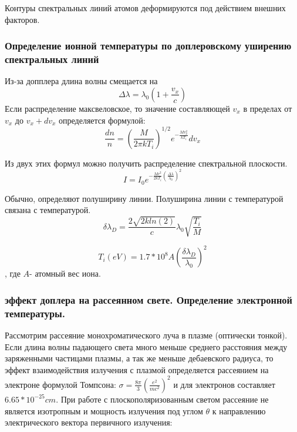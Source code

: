 \documentclass[10pt, a4paper]{article}
\numberwithin{equation}{section}
\begin{document}
Контуры спектральных линий атомов деформируются под действием внешних факторов.
\subsubsection{Определение ионной температуры по доплеровскому уширению спектральных линий}
\label{11.2.3.1}



Из-за допплера длина волны смещается на 
\begin{equation}
	\Delta \lambda = \lambda_0 (1+\frac{v_x}{c})
\end{equation}
Если распределение максвеловское, то  значение составляющей $v_x$  в пределах от  $v_x$  до $v_x + dv_x$ определяется формулой:
\begin{equation}
	\frac{dn}{n}=(\frac{M}{2\pi kT_i})^{1/2} e^{-\frac{Mv^{2}_x}{kT_i}} dv_x
\end{equation}

Из двух этих формул можно получить распределение спектральной плоскости.
\begin{equation}
	I=I_0 e^{-\frac{Mc^{2}}{2kT_i} (\frac{\Delta \lambda}{\lambda_0})^{2}}
\end{equation}

Обычно, определяют полуширину линии. Полуширина линии с температурой связана с температурой.
\begin{equation}
	\delta \lambda_D=\frac{2 \sqrt{2k ln(2)}}{c} \lambda_0 \sqrt{\frac{T_i}{M}}
\end{equation}


\begin{equation}
	T_i(eV)=1.7*10^{8}A(\frac{\delta \lambda_D}{\lambda_0})^{2}
\end{equation}
, где $A$- атомный вес иона.

\subsubsection{эффект доплера на рассеянном свете. Определение электронной температуры.}
\label{11.2.3.2}

Рассмотрим рассеяние монохроматического луча в плазме (оптически тонкой). Если длина волны падающего света много меньше среднего расстояния между заряженными частицами плазмы, а так же меньше дебаевского радиуса, то эффект взаимодействия излучения с плазмой определяется рассеянием на электроне формулой Томпсона: $\sigma =\frac{8\pi}{3} (\frac{e^{2}}{mc^{2}})^{2}$ и для электронов составляет $6.65*10^{-25} cm$.
При работе с плоскополяризованным светом рассеяние не является изотропным и мощность излучения под углом $\theta$ к направлению электрического вектора первичного излучения:
\end{document}
